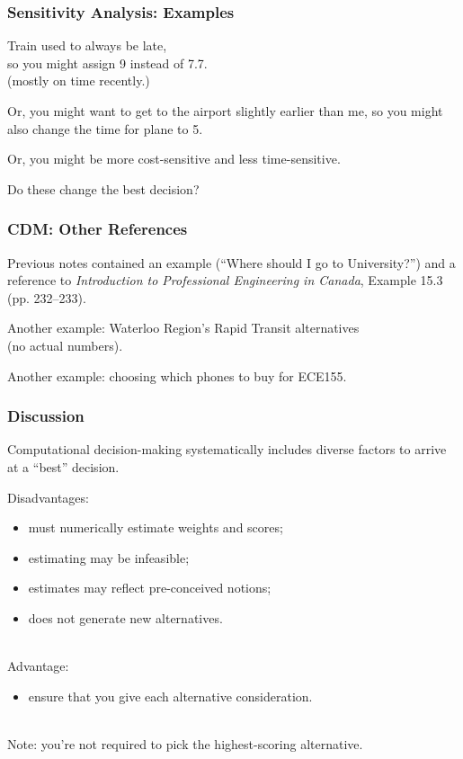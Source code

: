 \begin{frame}
\frametitle{Sensitivity Analysis: Examples}

\begin{changemargin}{1cm}
Train used to always be late, \\ so you might assign 9
instead of 7.7. \\ \qquad (mostly on time recently.) 

Or, you
might want to get to the airport slightly earlier than me, so you might also
change the time for plane to 5.

Or, you might be more cost-sensitive and less time-sensitive.

Do these change the best decision?
\end{changemargin}
\end{frame}

\begin{frame}
\frametitle{CDM: Other References}

\begin{changemargin}{1em}
Previous notes contained an example (``Where should I go to
University?'') and a reference to \emph{Introduction to
  Professional Engineering in Canada}, Example 15.3
(pp. 232--233). 

Another example: Waterloo Region's
Rapid Transit alternatives \\ \qquad (no actual numbers). 

Another example: choosing which phones to buy for ECE155.
\end{changemargin}
\end{frame}

\begin{frame}
\frametitle{Discussion}

\begin{changemargin}{2em}
Computational decision-making systematically includes diverse factors
to arrive at a ``best'' decision.

Disadvantages:
\begin{itemize}
\item must numerically estimate weights and scores;
\item estimating may be infeasible;
\item estimates may reflect pre-conceived notions;
\item does not generate new alternatives.
\end{itemize}~\\

Advantage:
\begin{itemize}
\item ensure that you give each alternative consideration.
\end{itemize}~\\

Note: you're not required to pick the highest-scoring alternative.

\end{changemargin}
\end{frame}




